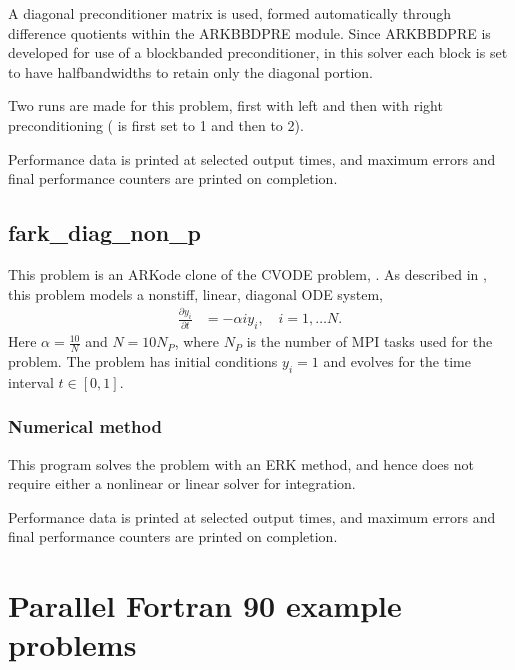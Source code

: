 \documentclass[letterpaper,10pt,english]{sphinxmanual}
\begin{document}
\sphinxAtStartPar
A diagonal preconditioner matrix is used, formed automatically through
difference quotients within the ARKBBDPRE module.  Since ARKBBDPRE is
developed for use of a block\sphinxhyphen{}banded preconditioner, in this solver
each block is set to have half\sphinxhyphen{}bandwidths  to
retain only the diagonal portion.

\sphinxAtStartPar
Two runs are made for this problem, first with left and then with
right preconditioning ( is first set to 1 and then to 2).

\sphinxAtStartPar
Performance data is printed at selected output times, and maximum
errors and final performance counters are printed on completion.


\section{fark\_diag\_non\_p}
\label{\detokenize{f77_parallel:fark-diag-non-p}}\label{\detokenize{f77_parallel:id3}}
\sphinxAtStartPar
This problem is an ARKode clone of the CVODE problem,
.  As described in , this problem models a
nonstiff, linear, diagonal ODE system,
\begin{equation*}
\begin{split}\frac{\partial y_i}{\partial t} &= -\alpha i y_i, \quad i=1,\ldots N.\end{split}
\end{equation*}
\sphinxAtStartPar
Here \(\alpha=\frac{10}{N}\) and \(N=10 N_P\), where \(N_P\) is the
number of MPI tasks used for the problem.  The problem has initial
conditions \(y_i=1\) and evolves for the time interval \(t\in [0,1]\).


\subsection{Numerical method}
\label{\detokenize{f77_parallel:id5}}
\sphinxAtStartPar
This program solves the problem with an ERK method, and hence does not
require either a nonlinear or linear solver for integration.

\sphinxAtStartPar
Performance data is printed at selected output times, and maximum
errors and final performance counters are printed on completion.

\sphinxstepscope


\chapter{Parallel Fortran 90 example problems}
\label{\detokenize{f90_parallel:parallel-fortran-90-example-problems}}\label{\detokenize{f90_parallel:parallel-f90}}\label{\detokenize{f90_parallel::doc}}
\end{document}

